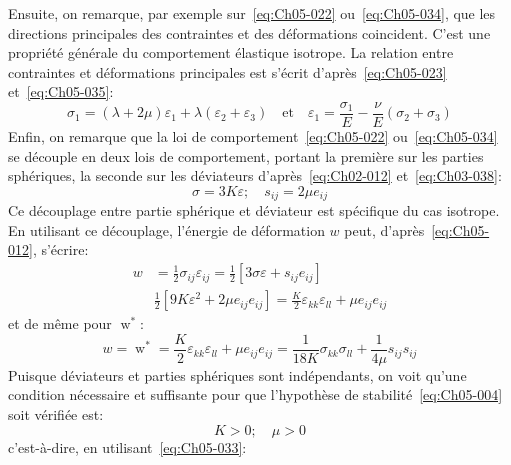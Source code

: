 Ensuite, on remarque, par exemple sur~\eqref{eq:Ch05-022} ou~\eqref{eq:Ch05-034}, que les directions principales des contraintes et des déformations coincident.
C'est une propriété générale du comportement élastique isotrope.
La relation entre contraintes et déformations principales est s'écrit d'après~\eqref{eq:Ch05-023} et~\eqref{eq:Ch05-035}: 
\begin{equation}
    \sigma_1 = \left( \lambda + 2 \mu \right) \varepsilon_1 + \lambda \left( \varepsilon_2 + \varepsilon_3 \right)
\quad\text{et}\quad
    \varepsilon_1 = \frac{\sigma_1}{E} - \frac{\nu}{E} \left( \sigma_2 + \sigma_3 \right)
    \label{eq:Ch05-038}
\end{equation}
Enfin, on remarque que la loi de comportement~\eqref{eq:Ch05-022} ou~\eqref{eq:Ch05-034} se découple en deux lois de comportement, portant la première sur les parties sphériques, la seconde sur les déviateurs d'après~\eqref{eq:Ch02-012} et~\eqref{eq:Ch03-038}:
\begin{equation}
    \sigma = 3 K \varepsilon; \quad s_{ij} = 2 \mu e_{ij}
    \label{eq:Ch05-039}
\end{equation}
Ce découplage entre partie sphérique et déviateur est spécifique du cas isotrope.
En utilisant ce découplage, l'énergie de déformation $w$ peut, d'après~\eqref{eq:Ch05-012}, s'écrire: 
\begin{equation*}
    \begin{split}
        w &= \frac{1}{2} \sigma_{ij} \varepsilon_{ij} = \frac{1}{2} \left[ 3 \sigma \varepsilon + s_{ij} e_{ij} \right] \\
        & \frac{1}{2} \left[ 9 K \varepsilon^2 + 2\mu e_{ij} e_{ij} \right] = \frac{K}{2} \varepsilon_{kk} \varepsilon_{ll} + \mu e_{ij} e_{ij}
    \end{split}
\end{equation*}
et de même pour $\mathop{w}^*$:
\begin{equation}
    w=\mathop{w}^* = \frac{K}{2} \varepsilon_{kk} \varepsilon_{ll} + \mu e_{ij} e_{ij} = \frac{1}{18K} \sigma_{kk} \sigma_{ll} + \frac{1}{4\mu} s_{ij} s_{ij}
    \label{eq:Ch05-049}
\end{equation}
Puisque déviateurs et parties sphériques sont indépendants, on voit qu'une condition nécessaire et suffisante pour que l'hypothèse de stabilité~\eqref{eq:Ch05-004} soit vérifiée est: 
\begin{equation}
    K>0; \quad \mu >0
    \label{eq:Ch05-050}
\end{equation}
c'est-à-dire, en utilisant~\eqref{eq:Ch05-033}: 
